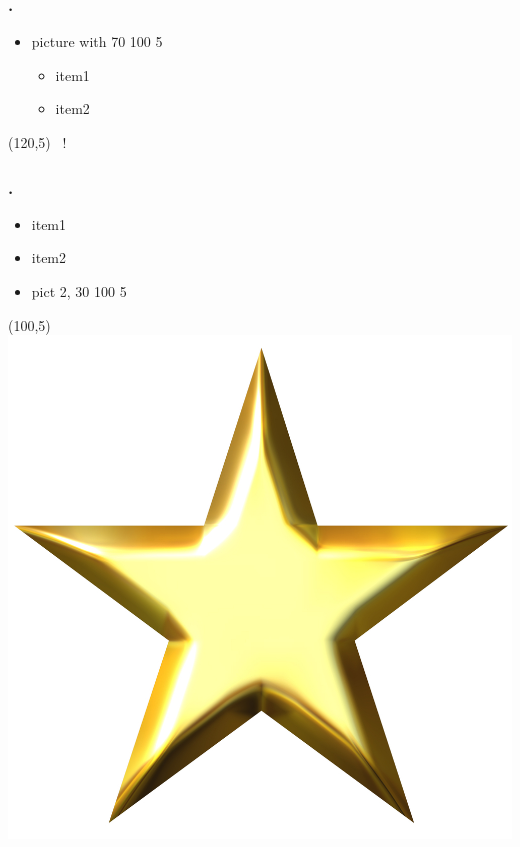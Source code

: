 \documentclass[12pt,t]{beamer}
\newcommand{\markslide}{\textcolor{blue}{\textbullet~}}
\begin{document}
\begin{frame}
\frametitle{\thesection.~\insertsection}
\begin{itemize}
\item picture with 70 100 5
\begin{itemize}
\item item1
\item item2
\end{itemize}
\end{itemize}
\begin{textblock}{70}(120,5)
   {\markslide !}
\end{textblock}
\end{frame}


\begin{frame}
\frametitle{\thesection.~\insertsection}
\begin{itemize}
\begin{itemize}
\item item1
\item item2
\item pict 2, 30 100 5 
\end{itemize}
\end{itemize}
\begin{textblock}{30}(100,5)
    \includegraphics[scale=0.3]{star.jpg}
\end{textblock}
\end{frame}
\end{document}
